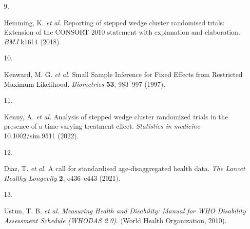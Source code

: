 \documentclass[
]{scrartcl}
\newlength{\cslhangindent}
\newlength{\csllabelwidth}
\newlength{\cslentryspacingunit} %
\newenvironment{CSLReferences}[2] %
 {%
  \setlength{\parindent}{0pt}
  \ifodd #1
  \let\oldpar\par
  \def\par{\hangindent=\cslhangindent\oldpar}
  \fi
  \setlength{\parskip}{#2\cslentryspacingunit}
 }%
 {}
\newcommand{\CSLLeftMargin}[1]{\parbox[t]{\csllabelwidth}{#1}}
\newcommand{\CSLRightInline}[1]{\parbox[t]{\linewidth - \csllabelwidth}{#1}\break}
\begin{document}
\begin{CSLReferences}{0}{0}
\leavevmode{}%
\CSLLeftMargin{9. }%
\CSLRightInline{Hemming, K. \emph{et al.} Reporting of stepped wedge
cluster randomised trials: Extension of the CONSORT 2010 statement with
explanation and elaboration. \emph{BMJ} k1614 (2018).}

\leavevmode{}%
\CSLLeftMargin{10. }%
\CSLRightInline{Kenward, M. G. \emph{et al.} Small {Sample} {Inference}
for {Fixed} {Effects} from {Restricted} {Maximum} {Likelihood}.
\emph{Biometrics} \textbf{53}, 983--997 (1997).}

\leavevmode{}%
\CSLLeftMargin{11. }%
\CSLRightInline{Kenny, A. \emph{et al.} Analysis of stepped wedge
cluster randomized trials in the presence of a time-varying treatment
effect. \emph{Statistics in medicine} 10.1002/sim.9511 (2022).}

\leavevmode{}%
\CSLLeftMargin{12. }%
\CSLRightInline{Diaz, T. \emph{et al.} A call for standardised
age-disaggregated health data. \emph{The Lancet Healthy Longevity}
\textbf{2}, e436--e443 (2021).}

\leavevmode{}%
\CSLLeftMargin{13. }%
\CSLRightInline{Ustun, T. B. \emph{et al.} \emph{Measuring {Health} and
{Disability}: {Manual} for {WHO} {Disability} {Assessment} {Schedule}
({WHODAS} 2.0)}. (World Health Organization, 2010).}

\end{CSLReferences}
\end{document}
